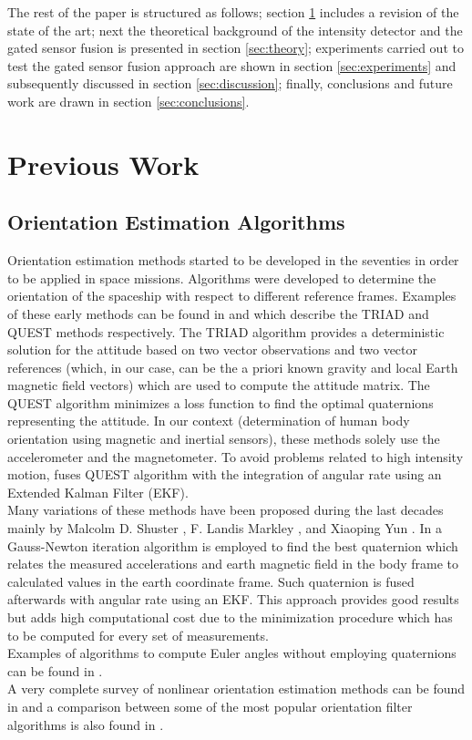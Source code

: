 \documentclass{IOS-Book-Article}
\begin{document}
The rest of the paper is structured as follows; section \ref{sec:previous_work} includes a revision of the state of the art; next the theoretical background of the intensity detector and the gated sensor fusion is presented in section \ref{sec:theory}; experiments carried out to test the gated sensor fusion approach are shown in section \ref{sec:experiments} and subsequently discussed in section \ref{sec:discussion}; finally, conclusions and future work are drawn in section \ref{sec:conclusions}.

\section{Previous Work}
\label{sec:previous_work}

\subsection{Orientation Estimation Algorithms}
\label{subsec:orientation_review}
\indent \indent Orientation estimation methods started to be developed in the seventies in order to be applied in space missions. Algorithms were developed to determine the orientation of the spaceship with respect to different reference frames.
Examples of these early methods can be found in \cite{lerner78} and \cite{shuster_three-axis_1981} which describe the TRIAD and QUEST methods respectively. The TRIAD algorithm provides a deterministic solution for the attitude based on two vector observations and two vector references (which, in our case, can be the a priori known gravity and local Earth magnetic field vectors) which are used to compute the attitude matrix. The QUEST algorithm minimizes a loss function to find the optimal quaternions representing the attitude. In our context (determination of human body orientation using magnetic and inertial sensors), these methods solely use the accelerometer and the magnetometer. To avoid problems related to high intensity motion, \cite{yun_design_2006} fuses QUEST algorithm with the integration of angular rate using an Extended Kalman Filter (EKF). \\
\indent Many variations of these methods have been proposed during the last decades mainly by Malcolm D. Shuster \cite{malcolmPub1}, F. Landis Markley \cite{Landis2000}, and Xiaoping Yun \cite{marins_extended_2001}. In \cite{marins_extended_2001} a Gauss-Newton iteration algorithm is employed to find the best quaternion which relates the measured accelerations and earth magnetic field in the body frame to calculated values in the earth coordinate frame. Such quaternion is fused afterwards with angular rate using an EKF. This approach provides good results but adds high computational cost due to the minimization procedure which has to be computed for every set of measurements. \\
\indent Examples of algorithms to compute Euler angles without employing quaternions can be found in \cite{Salhuana2012}.\\
\indent A very complete survey of nonlinear orientation estimation methods can be found in \cite{crassidis_survey_2007} and a comparison between some of the most popular orientation filter algorithms is also found in \cite{young_comparison_2009}.
\end{document}
